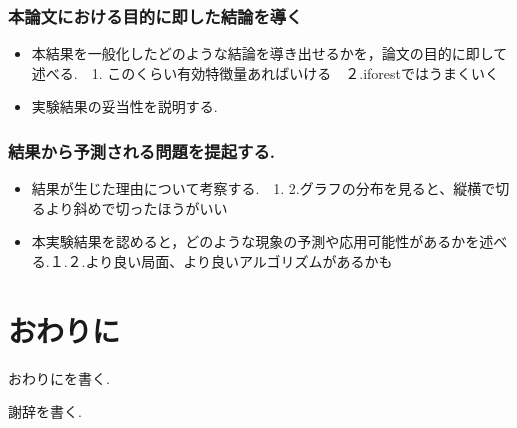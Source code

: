 \documentclass{css}
\begin{document}
\subsubsection{本論文における目的に即した結論を導く}
\begin{itemize}
    \item 本結果を一般化したどのような結論を導き出せるかを，論文の目的に即して述べる.　1. このくらい有効特徴量あればいける　２.iforestではうまくいく
    \item 実験結果の妥当性を説明する.
\end{itemize}

\subsubsection{結果から予測される問題を提起する.}
\begin{itemize}
    \item 結果が生じた理由について考察する.　1. 2.グラフの分布を見ると、縦横で切るより斜めで切ったほうがいい
    \item 本実験結果を認めると，どのような現象の予測や応用可能性があるかを述べる.１.２.より良い局面、より良いアルゴリズムがあるかも
\end{itemize}

\section{おわりに}
おわりにを書く.

\begin{acknowledgment}
謝辞を書く.
\end{acknowledgment}

\begin{thebibliography}{10}

\end{thebibliography}
\end{document}
